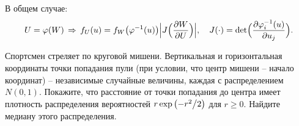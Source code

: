 \begin{ordre}
В общем случае: 
$$
U=\varphi(W) \,\Rightarrow\, f_U(u)=f_W\bigl(\varphi^{-1}(u)\bigr) \Bigl| J\Bigl( \frac{\partial W}{\partial U}\Bigr)\Bigr|, \quad 
J(\cdot)=\det\Bigl( \frac{\partial \varphi_i^{-1}(u)}{\partial u_j}\Bigr) . 
$$
\end{ordre}


\begin{problem}
Спортсмен стреляет по круговой мишени. Вертикальная и горизонтальная 
координаты точки попадания пули (при условии, что центр мишени -- начало 
координат) -- независимые случайные величины, каждая с распределением 
$N(0,1)$. Покажите, что расстояние от точки попадания до центра имеет 
плотность распределения вероятностей $r\exp \left( {-{r^2} \mathord{\left/ 
{\vphantom {{r^2} 2}} \right. \kern-\nulldelimiterspace} 2} \right)$ для 
$r\ge 0$. Найдите медиану этого распределения.
\end{problem}